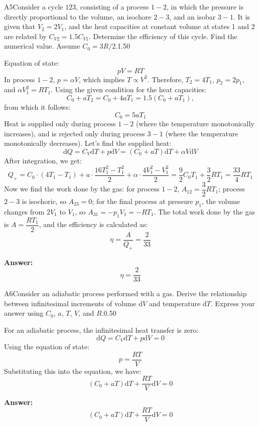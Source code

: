 \documentclass[11pt,a4paper]{article}
\begin{document}
\begin{solcard}{A5}{Consider a cycle $123$, consisting of a process $1-2$, in which the pressure is directly proportional to the volume, an isochore $2-3$, and an isobar $3-1$. It is given that $V_2 = 2 V_1$, and the heat capacities at constant volume at states 1 and 2 are related by $C_{V2} = 1.5 C_{V1}$. Determine the efficiency of this cycle. Find the numerical value. Assume $C_0 = 3R/2$.}{1.50}

Equation of state: \[pV=RT\]In process $1-2$, $p=\alpha V$, which implies $T \propto V^2$. Therefore, $T_2=4T_1$, $p_2=2p_1$, and $\alpha V_1^2=RT_1$. Using the given condition for the heat capacities: \[C_0+aT_2=C_0+4aT_1=1.5(C_0+aT_1),\]from which it follows: \[C_0=5aT_1\]Heat is supplied only during process $1-2$ (where the temperature monotonically increases), and is rejected only during process $3-1$ (where the temperature monotonically decreases). Let's find the supplied heat: \[\mathrm dQ=C_V\mathrm dT+p\mathrm dV=(C_0+aT)\mathrm dT+\alpha V\mathrm dV\]After integration, we get: \[Q_+=C_0\cdot (4T_1-T_1)+a\cdot \dfrac{16T_1^2-T_1^2}{2}+\alpha\cdot\dfrac{4V_1^2-V_1^2}{2}=\dfrac{9}{2}C_0T_1+\dfrac{3}{2}RT_1=\dfrac{33}{4}RT_1\]Now we find the work done by the gas: for process $1-2$, $A_{12}=\dfrac{3}{2}RT_1$; process $2-3$ is isochoric, so $A_{23}=0$; for the final process at pressure $p_1$, the volume changes from $2V_1$ to $V_1$, so $A_{31}=-p_1V_1=-RT_1$. The total work done by the gas is $A=\dfrac{RT_1}{2}$, and the efficiency is calculated as: \[\eta=\dfrac{A}{Q_+}=\dfrac{2}{33}\]

\par\smallskip\noindent\textbf{Answer:} \[\eta=\dfrac{2}{33}\]
\end{solcard}

\begin{solcard}{A6}{Consider an adiabatic process performed with a gas. Derive the relationship between infinitesimal increments of volume $\mathrm dV$ and temperature $\mathrm dT$. Express your answer using $C_0$, $a$, $T$, $V$, and $R$.}{0.50}

For an adiabatic process, the infinitesimal heat transfer is zero: \[\mathrm dQ=C_V\mathrm dT+p\mathrm dV=0\]Using the equation of state: \[p=\dfrac{RT}{V}\]Substituting this into the equation, we have: \[(C_0+aT)\mathrm dT+\dfrac{RT}{V}\mathrm dV=0\]

\par\smallskip\noindent\textbf{Answer:} \[(C_0+aT)\mathrm dT+\dfrac{RT}{V}\mathrm dV=0\]
\end{solcard}
\end{document}
